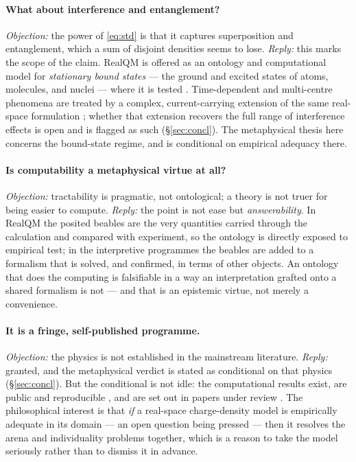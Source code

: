 \documentclass[11pt]{article}
\begin{document}
\paragraph{What about interference and entanglement?} \emph{Objection:} the power of \eqref{eq:std} is that
it captures superposition and entanglement, which a sum of disjoint densities seems to lose. \emph{Reply:}
this marks the scope of the claim. RealQM is offered as an ontology and computational model for
\emph{stationary bound states} --- the ground and excited states of atoms, molecules, and nuclei --- where
it is tested \cite{RealQM,RealQMatoms,RealNucleus}. Time-dependent and multi-centre phenomena are treated
by a complex, current-carrying extension of the same real-space formulation \cite{RealQM}; whether that
extension recovers the full range of interference effects is open and is flagged as such (\S\ref{sec:concl}).
The metaphysical thesis here concerns the bound-state regime, and is conditional on empirical adequacy
there.

\paragraph{Is computability a metaphysical virtue at all?} \emph{Objection:} tractability is pragmatic, not
ontological; a theory is not truer for being easier to compute. \emph{Reply:} the point is not ease but
\emph{answerability}. In RealQM the posited beables are the very quantities carried through the calculation
and compared with experiment, so the ontology is directly exposed to empirical test; in the interpretive
programmes the beables are added to a formalism that is solved, and confirmed, in terms of other objects.
An ontology that does the computing is falsifiable in a way an interpretation grafted onto a shared
formalism is not --- and that is an epistemic virtue, not merely a convenience.

\paragraph{It is a fringe, self-published programme.} \emph{Objection:} the physics is not established in
the mainstream literature. \emph{Reply:} granted, and the metaphysical verdict is stated as conditional on
that physics (\S\ref{sec:concl}). But the conditional is not idle: the computational results exist, are
public and reproducible \cite{RealQMgallery}, and are set out in papers under review
\cite{RealQMatoms,RealNucleus,QCDBinding}. The philosophical interest is that \emph{if} a real-space
charge-density model is empirically adequate in its domain --- an open question being pressed --- then it
resolves the arena and individuality problems together, which is a reason to take the model seriously
rather than to dismiss it in advance.
\end{document}
